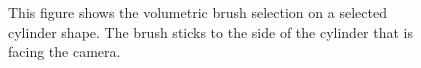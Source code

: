 \begin{figure}
\centering
{}
\caption[Example of an improved volumetric brush selection on a cylinder]
{This figure shows the volumetric brush selection on a selected cylinder shape. The brush sticks to the side of the cylinder that is facing the camera.}
\label{fig:syntheticScene_brush}
\end{figure}